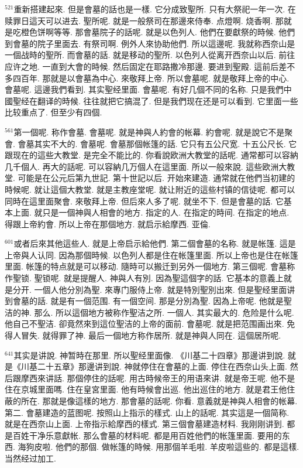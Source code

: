 \documentclass{book}
\begin{document}
$^{521}$重新搭建起來.
但是會墓的話也是一樣.
它分成致聖所.
只有大祭祀一年一次.
在赎罪日這天可以进去.
聖所呢.
就是一般祭司在那邊來侍奉.
点燈啊.
烧香啊.
那就是吃橙色饼啊等等.
那會墓院子的話呢.
就是以色列人.
他們在要獻祭的時候.
他們到會墓的院子里面去.
有祭司啊.
例外人來协助他們.
所以這邊呢.
我就称西奈山是一個战時的聖所.
而會墓的話.
就是移动的聖所.
以色列人從离开西奈山以后.
前往应许之地.
一直到大會的時候.
然后固定在耶路撒冷那邊.
要进到聖殿.
這前后差不多四百年.
那就是以會墓為中心.
來敬拜上帝.
所以會墓呢.
就是敬拜上帝的中心.
會墓呢.
這邊我們看到.
其实聖经里面.
會墓呢.
有好几個不同的名称.
只是我們中國聖经在翻译的時候.
往往就把它搞混了.
但是我們现在还是可以看到.
它里面一些比较重点了.
但至少有四個.

$^{561}$第一個呢.
称作會墓.
會墓呢.
就是神與人約會的帐幕.
約會呢.
就是說它不是聚會.
會墓其实不大的.
會墓呢.
會墓那個帐篷的話.
它只有五公尺宽.
十五公尺长.
它跟现在的這些大教堂.
是完全不能比的.
你看說欧洲大教堂的話呢.
通常都可以容納几千個人.
再大的話呢.
可以容納几万個人在這里面.
所以一般來說.
這些欧洲大教堂.
可能是在公元后第九世記.
第十世記以后.
开始來建造.
通常就在他們当初建的時候呢.
就让這個大教堂.
就是主教座堂呢.
就让附近的這些村镇的信徒呢.
都可以同時在這里面聚會.
來敬拜上帝.
但后來人多了呢.
就坐不下.
但是會墓的話.
它基本上面.
就只是一個神與人相會的地方.
指定的人.
在指定的時间.
在指定的地点.
得跟上帝約會.
所以上帝在那個地方.
就启示給摩西.
亚倫.

$^{601}$或者后來其他這些人.
就是上帝启示給他們.
第二個會墓的名称.
就是帐篷.
這是上帝與人认同.
因為那個時候.
以色列人都是住在帐篷里面.
所以上帝也是住在帐篷里面.
帐篷的特点就是可以移动.
隨時可以搬迁到另外一個地方.
第三個呢.
會墓称作聖锁.
聖锁呢.
就是提醒人.
神與人有別.
因為聖這個字的話.
它基本的意義上就是分开.
一個人他分別為聖.
來專门服侍上帝.
就是特別聖別出來.
但是聖经里面讲到會墓的話.
就是有一個范围.
有一個空间.
那是分別為聖.
因為上帝呢.
他就是聖洁的神.
那么.
所以這個地方被称作聖洁之所.
一個人.
其实最大的.
危险是什么呢.
他自己不聖洁.
卻竟然來到這位聖洁的上帝的面前.
會墓呢.
就是把范围画出來.
免得人冒失.
就得罪了神.
最后一個地方称作居所.
就是神與人同在.
這個居所呢.

$^{641}$其实是讲說.
神暂時在那里.
所以聖经里面像.
《川基二十四章》那邊讲到說.
就是《川基二十五章》那邊讲到說.
神就停住在會墓的上面.
停住在西奈山头上面.
然后跟摩西來讲話.
那個停住的話呢.
用古時候帝王的用语來讲.
就是帝王呢.
他不是住在京城里面嗎.
住在皇宮里面.
他有時候會出巡.
他出巡住的地方.
就是君王他住蔽的所在.
那就是像這樣的地方.
那會墓的話呢.
你看.
意義就是神與人相會的帐幕.
第二.
會墓建造的蓝图呢.
按照山上指示的樣式.
山上的話呢.
其实這是一個简称.
就是在西奈山上面.
上帝指示給摩西的樣式.
第三個會墓建造材料.
我刚刚讲到.
都是百姓干净乐意獻帐.
那么會墓的材料呢.
都是用百姓他們的帐篷里面.
要用的东西.
海狗皮啦.
他們的那個.
做帐篷的時候.
用那個羊毛啦.
羊皮啦這些的.
都是這樣.
当然经过加工.
\end{document}

